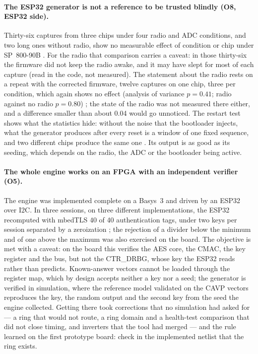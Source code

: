 \paragraph{The ESP32 generator is not a reference to be trusted blindly
(O8, ESP32 side).} Thirty-six captures from three chips under four radio
and \ac{ADC} conditions, and two long ones without radio, show no
measurable effect of condition or chip under SP~800-90B \meas{}. For the
radio that comparison carries a caveat: in those thirty-six the firmware
did not keep the radio awake, and it may have slept for most of each
capture (read in the code, not measured). The statement about the radio
rests on a repeat with the corrected firmware, twelve captures on one
chip, three per condition, which again shows no effect (analysis of
variance $p = 0.41$; radio against no radio $p = 0.80$) \meas{}; the
state of the radio was not measured there either, and a difference
smaller than about 0.04 would go unnoticed. The restart test shows what the statistics
hide: without the noise that the bootloader injects, what the generator
produces after every reset is a window of one fixed sequence, and two
different chips produce the same one \meas{}. Its output is as good as its seeding, which
depends on the radio, the \ac{ADC} or the bootloader being active.

\paragraph{The whole engine works on an FPGA with an independent verifier
(O5).} The engine was implemented complete on a Basys~3 and driven by an
ESP32 over \ac{I2C}. In three sessions, on three different
implementations, the ESP32 recomputed with mbedTLS 40 of 40
authentication tags, under two keys per session separated by a
zeroization \meas{}; the rejection of a divider below the minimum and of
one above the maximum was also exercised on the board. The objective is
met with a caveat: on the board this verifies the \ac{AES} core, the
\ac{CMAC}, the key register and the bus, but not the CTR\_DRBG, whose
key the ESP32 reads rather than predicts. Known-answer vectors cannot be
loaded through the register map, which by design accepts neither a key
nor a seed; the generator is verified in simulation, where the
reference model validated on the \ac{CAVP} vectors reproduces the key,
the random output and the second key from the seed the engine
collected. Getting there took
corrections that no simulation had asked for --- a ring that would not
route, a ring domain and a health-test comparison that did not close
timing, and inverters that the tool had merged --- and the rule
learned on the first prototype board: check in the implemented netlist
that the ring exists.

